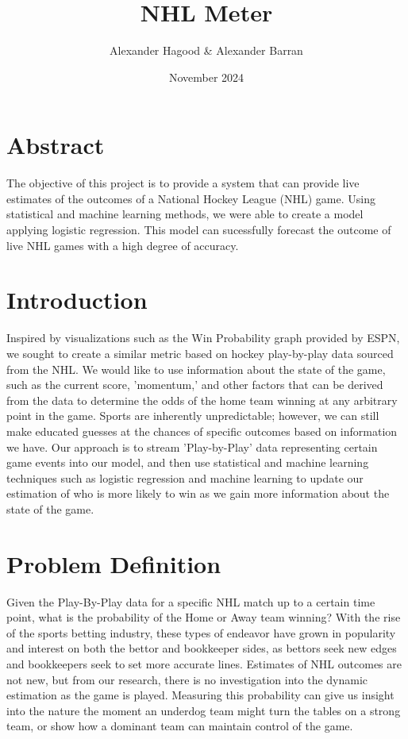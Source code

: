 \documentclass{article}
\title{NHL Meter}
\author{Alexander Hagood \& Alexander Barran}
\date{November 2024}
\begin{document}
\maketitle

\section{Abstract}
The objective of this project is to provide a system that can provide live estimates of the outcomes of a National Hockey League (NHL) game.
Using statistical and machine learning methods, we were able to create a model applying logistic regression. This model can sucessfully forecast
the outcome of live NHL games with a high degree of accuracy.

\section{Introduction}
Inspired by visualizations such as the Win Probability graph provided by ESPN, we sought to create a similar metric based on hockey play-by-play data sourced from the NHL.
We would like to use information about the state of the game, such as the current score, 'momentum,' and other factors that can be derived from the data to determine the odds of the home team winning at any arbitrary point in the game.
Sports are inherently unpredictable; however, we can still make educated guesses at the chances of specific outcomes based on information we have.
Our approach is to stream 'Play-by-Play' data representing certain game events into our model, and then use statistical and machine learning techniques such as logistic regression and machine learning to update our estimation of who is more likely to win as we gain more information about the state of the game.


\section{Problem Definition}
Given the Play-By-Play data for a specific NHL match up to a certain time point, 
what is the probability of the Home or Away team winning? With the rise of the sports
betting industry, these types of endeavor have grown in popularity and interest on
both the bettor and bookkeeper sides, as bettors seek new edges and bookkeepers seek
to set more accurate lines. Estimates of NHL outcomes are not new, but from our research,
there is no investigation into the dynamic estimation as the game is played. Measuring
this probability can give us insight into the nature the moment an underdog team might
turn the tables on a strong team, or show how a dominant team can maintain control of the game.
\end{document}
